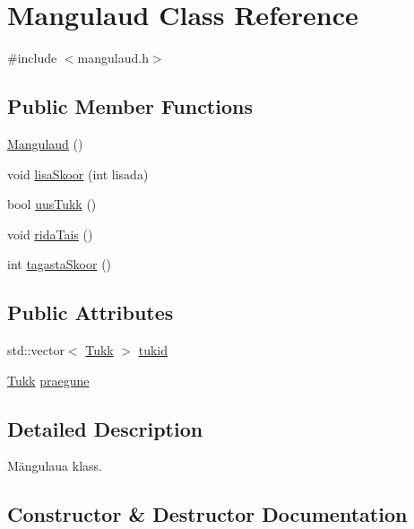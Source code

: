 \hypertarget{class_mangulaud}{}\section{Mangulaud Class Reference}
\label{class_mangulaud}


{\ttfamily \#include $<$mangulaud.\+h$>$}

\subsection*{Public Member Functions}
\begin{DoxyCompactItemize}
\item 
\mbox{\hyperlink{class_mangulaud_aaa04c0374a469d942b76b8ca2628ded6}{Mangulaud}} ()
\item 
void \mbox{\hyperlink{class_mangulaud_ac1eb20dea1713fbf7baacecefcd76481}{lisa\+Skoor}} (int lisada)
\item 
bool \mbox{\hyperlink{class_mangulaud_a9d6ac3b57461e3258dba146adbd653eb}{uus\+Tukk}} ()
\item 
void \mbox{\hyperlink{class_mangulaud_a5b22a965c640d97549afcef1a101278d}{rida\+Tais}} ()
\item 
int \mbox{\hyperlink{class_mangulaud_a38e9432a82198c83a445629086980904}{tagasta\+Skoor}} ()
\end{DoxyCompactItemize}
\subsection*{Public Attributes}
\begin{DoxyCompactItemize}
\item 
std\+::vector$<$ \mbox{\hyperlink{class_tukk}{Tukk}} $>$ \mbox{\hyperlink{class_mangulaud_a156a2c25e2adc3f830d3094e3f1693ff}{tukid}}
\item 
\mbox{\hyperlink{class_tukk}{Tukk}} \mbox{\hyperlink{class_mangulaud_a42c3121190a81047c4d3aba5e0365573}{praegune}}
\end{DoxyCompactItemize}


\subsection{Detailed Description}
Mängulaua klass. 

\subsection{Constructor \& Destructor Documentation}
\mbox{\label{class_mangulaud_aaa04c0374a469d942b76b8ca2628ded6}} 
